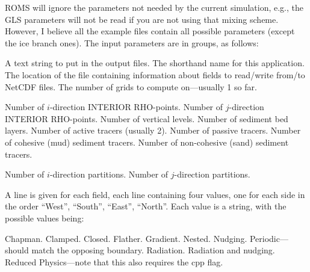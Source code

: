 ROMS will ignore the parameters not needed by the current
simulation, e.g., the GLS parameters will not be read if you are not
using that mixing scheme. However, I believe all the example files
contain all possible parameters (except the ice branch ones).
The input parameters are in groups, as follows:
\begin{klist}
    \mbox{}
     \begin{klist}
    A text string to put in the output files.
    The shorthand name for this application.
    The location of the  file
     containing information about fields to read/write from/to NetCDF
     files.
    The number of grids to compute on---usually 1 so
   far.
     \end{klist}
    \mbox{}
     \begin{klist}
        Number of $i$-direction INTERIOR RHO-points.
        Number of $j$-direction INTERIOR RHO-points.
        Number of vertical levels.
        Number of sediment bed layers.
        Number of active tracers (usually 2).
        Number of passive tracers.
        Number of cohesive (mud) sediment tracers.
        Number of non-cohesive (sand) sediment tracers.
     \end{klist}
    \mbox{}
     \begin{klist}
        Number of $i$-direction partitions.
        Number of $j$-direction partitions.
     \end{klist}
    \mbox{}
     \begin{klist}
        A line is given for each field, each line
       containing four values, one for each side in the order
       ``West'', ``South'', ``East'', ``North''. Each value is a
       string, with the possible values being:
         \begin{klist}
              Chapman.
              Clamped.
              Closed.
              Flather.
              Gradient.
              Nested.
              Nudging.
              Periodic---should match the opposing
boundary.
              Radiation.
           Radiation and nudging.
              Reduced Physics---note that this also
requires the  cpp flag.

\end{klist}
\end{klist}
\end{klist}
